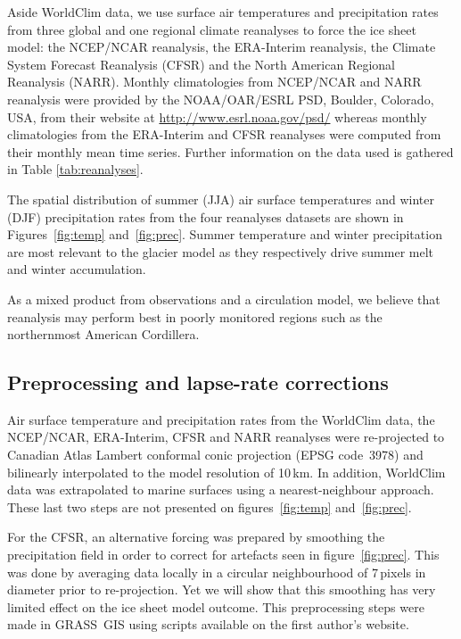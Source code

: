 Aside WorldClim data, we use surface air temperatures and precipitation rates from three global and one regional climate reanalyses to force the ice sheet model: the NCEP/NCAR reanalysis, the ERA-Interim reanalysis, the Climate System Forecast Reanalysis (CFSR) and the North American Regional Reanalysis (NARR). Monthly climatologies from NCEP/NCAR and NARR reanalysis were provided by the NOAA/OAR/ESRL PSD, Boulder, Colorado, USA, from their website at \url{http://www.esrl.noaa.gov/psd/} whereas monthly climatologies from the ERA-Interim and CFSR reanalyses were computed from their monthly mean time series. Further information on the data used is gathered in Table \ref{tab:reanalyses}.

The spatial distribution of summer (JJA) air surface temperatures and winter (DJF) precipitation rates from the four reanalyses datasets are shown in Figures~\ref{fig:temp} and~\ref{fig:prec}. Summer temperature and winter precipitation are most relevant to the glacier model as they respectively drive summer melt and winter accumulation.

As a mixed product from observations and a circulation model, we believe that reanalysis may perform best in poorly monitored regions such as the northernmost American Cordillera.


\subsection{Preprocessing and lapse-rate corrections}

Air surface temperature and precipitation rates from the WorldClim data, the NCEP/NCAR, ERA-Interim, CFSR and NARR reanalyses were re-projected to Canadian Atlas Lambert conformal conic projection (EPSG code~3978) and bilinearly interpolated to the model resolution of 10\,km. In addition, WorldClim data was extrapolated to marine surfaces using a nearest-neighbour approach. These last two steps are not presented on figures~\ref{fig:temp} and~\ref{fig:prec}.

For the CFSR, an alternative forcing was prepared by smoothing the precipitation field in order to correct for artefacts seen in figure~\ref{fig:prec}. This was done by averaging data locally in a circular neighbourhood of 7\,pixels in diameter prior to re-projection. Yet we will show that this smoothing has very limited effect on the ice sheet model outcome. This preprocessing steps were made in GRASS~GIS using scripts available on the first author's website.

